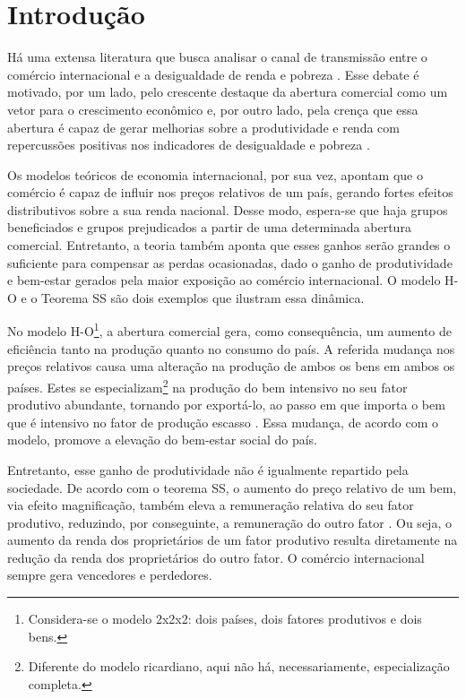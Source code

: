

\chapter{Introdução} \label{cha:introdução}

Há uma extensa literatura que busca analisar o canal de transmissão entre o comércio internacional e a desigualdade de renda e pobreza \cite{ferreira06, castilho12, bayar17, anderson20}. Esse debate é motivado, por um lado, pelo crescente destaque da abertura comercial como um vetor para o crescimento econômico \cite{sala07} e, por outro lado, pela crença que essa abertura é capaz de gerar melhorias sobre a produtividade e renda com repercussões positivas nos indicadores de desigualdade e pobreza \cite{carneiroarbache03}.

Os modelos teóricos de economia internacional, por sua vez, apontam que o comércio é capaz de influir nos preços relativos de um país, gerando fortes efeitos distributivos sobre a sua renda nacional. Desse modo, espera-se que haja grupos beneficiados e grupos prejudicados a partir de uma determinada abertura comercial. Entretanto, a teoria também aponta que esses ganhos serão grandes o suficiente para compensar as perdas ocasionadas, dado o ganho de produtividade e bem-estar gerados pela maior exposição ao comércio internacional. O modelo H-O e o Teorema SS são dois exemplos que ilustram essa dinâmica.

No modelo H-O\footnote{Considera-se o modelo 2x2x2: dois países, dois fatores produtivos e dois bens.}, a abertura comercial gera, como consequência, um aumento de eficiência tanto na produção quanto no consumo do país. A referida mudança nos preços relativos causa uma alteração na produção de ambos os bens em ambos os países. Estes se especializam\footnote{Diferente do modelo ricardiano, aqui não há, necessariamente, especialização completa.} na produção do bem intensivo no seu fator produtivo abundante, tornando por exportá-lo, ao passo em que importa o bem que é intensivo no fator de produção escasso \cite{heckscher49, ohlin67}. Essa mudança, de acordo com o modelo, promove a elevação do bem-estar social do país.

Entretanto, esse ganho de produtividade não é igualmente repartido pela sociedade. De acordo com o teorema SS, o aumento do preço relativo de um bem, via efeito magnificação, também eleva a remuneração relativa do seu fator produtivo, reduzindo, por conseguinte, a remuneração do outro fator \cite{stolper41}. Ou seja, o aumento da renda dos proprietários de um fator produtivo resulta diretamente na redução da renda dos proprietários do outro fator. O comércio internacional sempre gera vencedores e perdedores.

